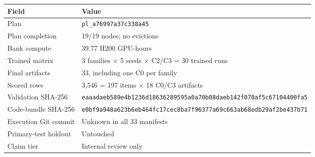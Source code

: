 \begin{center}
\label{tab:provenance}
\footnotesize
\begin{tabularx}{\textwidth}{@{}p{}X@{}}
\toprule
\textbf{Field} & \textbf{Value} \\
\midrule
Plan & \texttt{pl\_a76997a37c338a45} \\
Plan completion & 19/19 nodes; no evictions \\
Bank compute & 39.77 H200 GPU-hours \\
Trained matrix & 3 families $\times$ 5 seeds $\times$ C2/C3 = 30 trained runs \\
Final artifacts & 33, including one C0 per family \\
Scored rows & 3,546 = 197 items $\times$ 18 C0/C3 artifacts \\
Validation SHA-256 & \texttt{eaaadaeb589e4b1236d18636289595a0a70b08daeb142f070af5c67104400fa5} \\
Code-bundle SHA-256 & \texttt{e0bf9a948a623b6eb464fc17cec8ba7f96377a69c663ab68edb29af2be437b71} \\
Execution Git commit & Unknown in all 33 manifests \\
Primary-test holdout & Untouched \\
Claim tier & Internal review only \\
\bottomrule
\end{tabularx}
\end{center}
